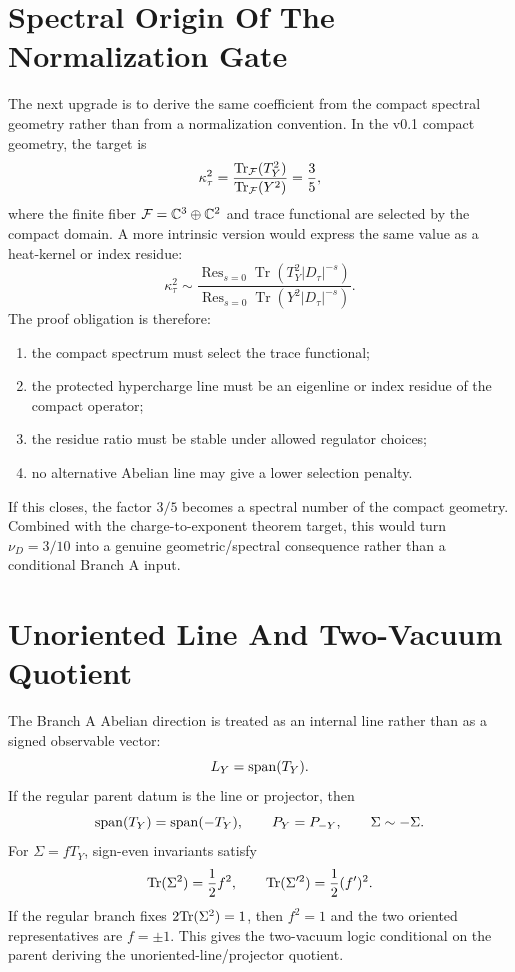 \documentclass[11pt]{article}
\begin{document}
\section{Spectral Origin Of The Normalization Gate}
The next upgrade is to derive the same coefficient from the compact spectral
geometry rather than from a normalization convention.  In the v0.1 compact
geometry, the target is
\begin{equation}
\kappa_\tau^2
=
\frac{\operatorname{Tr}_{\cal F}(T_Y^2)}{\operatorname{Tr}_{\cal F}(Y^2)}
=\frac35 ,
\end{equation}
where the finite fiber ${\cal F}=\mathbb C^3\oplus\mathbb C^2$ and trace
functional are selected by the compact domain.  A more intrinsic version would
express the same value as a heat-kernel or index residue:
\begin{equation}
\kappa_\tau^2
\sim
\frac{\operatorname{Res}_{s=0}\operatorname{Tr}(T_Y^2|D_\tau|^{-s})}
{\operatorname{Res}_{s=0}\operatorname{Tr}(Y^2|D_\tau|^{-s})} .
\end{equation}
The proof obligation is therefore:
\begin{enumerate}
\item the compact spectrum must select the trace functional;
\item the protected hypercharge line must be an eigenline or index residue of
the compact operator;
\item the residue ratio must be stable under allowed regulator choices;
\item no alternative Abelian line may give a lower selection penalty.
\end{enumerate}
If this closes, the factor $3/5$ becomes a spectral number of the compact
geometry.  Combined with the charge-to-exponent theorem target, this would turn
$\nu_D=3/10$ into a genuine geometric/spectral consequence rather than a
conditional Branch A input.

\section{Unoriented Line And Two-Vacuum Quotient}
The Branch A Abelian direction is treated as an internal line rather than as a
signed observable vector:
\begin{equation}
L_Y={\rm span}(T_Y).
\end{equation}
If the regular parent datum is the line or projector, then
\begin{equation}
{\rm span}(T_Y)={\rm span}(-T_Y),
\qquad
P_Y=P_{-Y},
\qquad
\Sigma\sim-\Sigma.
\end{equation}
For $\Sigma=fT_Y$, sign-even invariants satisfy
\begin{equation}
{\rm Tr}(\Sigma^2)=\frac12 f^2,
\qquad
{\rm Tr}(\Sigma'^2)=\frac12(f')^2.
\end{equation}
If the regular branch fixes $2{\rm Tr}(\Sigma^2)=1$, then $f^2=1$ and the
two oriented representatives are $f=\pm1$.  This gives the two-vacuum logic
conditional on the parent deriving the unoriented-line/projector quotient.
\end{document}
